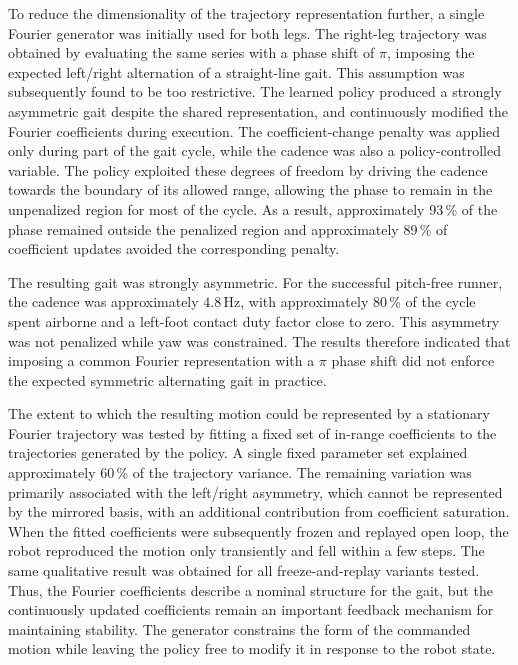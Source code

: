 To reduce the dimensionality of the trajectory representation further, a single Fourier generator was initially used for both legs.
The right-leg trajectory was obtained by evaluating the same series with a phase shift of $\pi$, imposing the expected left/right alternation of a straight-line gait.
This assumption was subsequently found to be too restrictive.
The learned policy produced a strongly asymmetric gait despite the shared representation, and continuously modified the Fourier coefficients during execution.
The coefficient-change penalty was applied only during part of the gait cycle, while the cadence was also a policy-controlled variable.
The policy exploited these degrees of freedom by driving the cadence towards the boundary of its allowed range, allowing the phase to remain in the unpenalized region for most of the cycle.
As a result, approximately 93\,\% of the phase remained outside the penalized region and approximately 89\,\% of coefficient updates avoided the corresponding penalty.

The resulting gait was strongly asymmetric.
For the successful pitch-free runner, the cadence was approximately $4.8\,\mathrm{Hz}$, with approximately 80\,\% of the cycle spent airborne and a left-foot contact duty factor close to zero.
This asymmetry was not penalized while yaw was constrained.
The results therefore indicated that imposing a common Fourier representation with a $\pi$ phase shift did not enforce the expected symmetric alternating gait in practice.

The extent to which the resulting motion could be represented by a stationary Fourier trajectory was tested by fitting a fixed set of in-range coefficients to the trajectories generated by the policy.
A single fixed parameter set explained approximately 60\,\% of the trajectory variance.
The remaining variation was primarily associated with the left/right asymmetry, which cannot be represented by the mirrored basis, with an additional contribution from coefficient saturation.
When the fitted coefficients were subsequently frozen and replayed open loop, the robot reproduced the motion only transiently and fell within a few steps.
The same qualitative result was obtained for all freeze-and-replay variants tested.
Thus, the Fourier coefficients describe a nominal structure for the gait, but the continuously updated coefficients remain an important feedback mechanism for maintaining stability.
The generator constrains the form of the commanded motion while leaving the policy free to modify it in response to the robot state.

